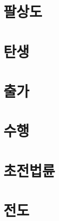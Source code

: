 \documentclass[12pt, a4paper, oneside]{book}
\let\stdsection\section
\renewcommand\section{\newpage\stdsection}
\begin{document}
%										
	\section{ 	팔상도	}							
										
%										
	\section{ 	탄생	}							
										
%										
	\section{ 	출가	}							
										
%										
	\section{ 	수행	}							
										
%										
	\section{ 	초전법륜	}							
										
%										
	\section{ 	전도	}							
										
\end{document}
